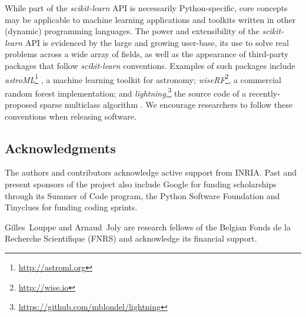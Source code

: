 \documentclass[twocolumn]{article}
\newcommand{\sklearn}{\textit{scikit-learn}\xspace}
\DeclareRobustCommand{\VAN}[3]{#2}
\begin{document}
While part of the \sklearn API is necessarily Python-specific,
core concepts may be applicable to
machine learning applications and toolkits
written in other (dynamic) programming languages.
The power and extensibility of the \sklearn API is evidenced
by the large and growing user-base, its use to solve real
problems across a wide array of fields,
as well as the appearance of third-party packages
that follow \sklearn conventions. Examples of such packages include
\textit{astroML}\footnote{\url{http://astroml.org}}
\citep{vanderplas2012astroML}, a machine learning toolkit for astronomy;
\textit{wiseRF}\footnote{\url{http://wise.io}}, a commercial random forest implementation;
and \textit{lightning},\footnote{\url{https://github.com/mblondel/lightning}}
the source code of a recently-proposed sparse multiclass
algorithm \citep{mblondel-mlj2013}.
We encourage researchers to follow these conventions when releasing software.

\subsection*{Acknowledgments}

The authors and contributors acknowledge active support from INRIA\@. Past and
present sponsors of the project also include Google for funding
scholarships through its Summer of Code program,
the Python Software Foundation and Tinyclues for funding coding sprints.

Gilles~Louppe and Arnaud~Joly are research fellows of the Belgian
Fonds de la Recherche Scientifique (FNRS)
and acknowledge its financial support.

{\small

\setlength{\bibsep}{1mm}
\DeclareRobustCommand{\VAN}[3]{#3}

}
\end{document}
